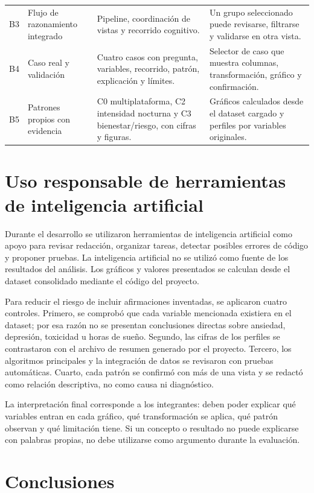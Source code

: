 \documentclass[12pt,a4paper]{article}
\begin{document}
\begin{longtable}{p{1.05cm} p{3.3cm} p{5.1cm} p{4.3cm}}
B3 & Flujo de razonamiento integrado & Pipeline, coordinaci\'on de vistas y recorrido cognitivo. & Un grupo seleccionado puede revisarse, filtrarse y validarse en otra vista. \\
B4 & Caso real y validaci\'on & Cuatro casos con pregunta, variables, recorrido, patr\'on, explicaci\'on y l\'imites. & Selector de caso que muestra columnas, transformaci\'on, gr\'afico y confirmaci\'on. \\
B5 & Patrones propios con evidencia & C0 multiplataforma, C2 intensidad nocturna y C3 bienestar/riesgo, con cifras y figuras. & Gr\'aficos calculados desde el dataset cargado y perfiles por variables originales. \\
\bottomrule
\end{longtable}

\section{Uso responsable de herramientas de inteligencia artificial}

Durante el desarrollo se utilizaron herramientas de inteligencia artificial como apoyo para revisar redacci\'on, organizar tareas, detectar posibles errores de c\'odigo y proponer pruebas. La inteligencia artificial no se utiliz\'o como fuente de los resultados del an\'alisis. Los gr\'aficos y valores presentados se calculan desde el dataset consolidado mediante el c\'odigo del proyecto.

Para reducir el riesgo de incluir afirmaciones inventadas, se aplicaron cuatro controles. Primero, se comprob\'o que cada variable mencionada existiera en el dataset; por esa raz\'on no se presentan conclusiones directas sobre ansiedad, depresi\'on, toxicidad u horas de sue\~no. Segundo, las cifras de los perfiles se contrastaron con el archivo de resumen generado por el proyecto. Tercero, los algoritmos principales y la integraci\'on de datos se revisaron con pruebas autom\'aticas. Cuarto, cada patr\'on se confirm\'o con m\'as de una vista y se redact\'o como relaci\'on descriptiva, no como causa ni diagn\'ostico.

La interpretaci\'on final corresponde a los integrantes: deben poder explicar qu\'e variables entran en cada gr\'afico, qu\'e transformaci\'on se aplica, qu\'e patr\'on observan y qu\'e limitaci\'on tiene. Si un concepto o resultado no puede explicarse con palabras propias, no debe utilizarse como argumento durante la evaluaci\'on.

\section{Conclusiones}
\end{document}
